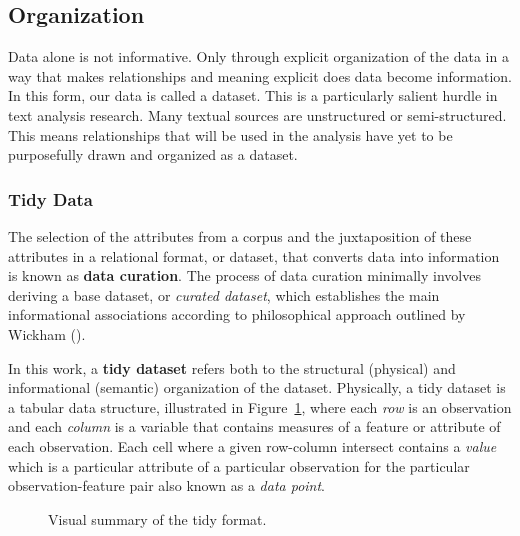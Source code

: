 \documentclass[
  letterpaper,
]{latex/krantz}
\theoremstyle{definition}
\theoremstyle{remark}
\begin{document}
\subsection{Organization}\label{sec-ud-organization}

Data alone is not informative. Only through explicit organization of the
data in a way that makes relationships and meaning explicit does data
become information. In this form, our data is called a dataset. This is
a particularly salient hurdle in text analysis research. Many textual
sources are unstructured or semi-structured. This means relationships
that will be used in the analysis have yet to be purposefully drawn and
organized as a dataset.

\subsubsection{Tidy Data}\label{sec-ud-tidy-data}

The selection of the attributes from a corpus and the juxtaposition of
these attributes in a relational format, or dataset, that converts data
into information is known as \textbf{data curation}. The process of data
curation minimally involves deriving a base dataset, or \emph{curated
dataset}, which establishes the main informational associations
according to philosophical approach outlined by Wickham
().

In this work, a \textbf{tidy dataset} refers both to the structural
(physical) and informational (semantic) organization of the dataset.
Physically, a tidy dataset is a tabular data structure, illustrated in
Figure~\ref{fig-ud-tidy-format-image}, where each \emph{row} is an
observation and each \emph{column} is a variable that contains measures
of a feature or attribute of each observation. Each cell where a given
row-column intersect contains a \emph{value} which is a particular
attribute of a particular observation for the particular
observation-feature pair also known as a \emph{data point}.

\begin{figure}[H]


\caption{\label{fig-ud-tidy-format-image}Visual summary of the tidy
format.}

\end{figure}%
\end{document}
